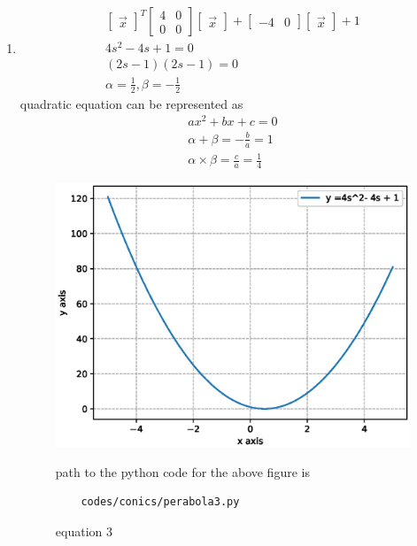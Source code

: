 \begin{enumerate}[label=\arabic*.,ref=\thesubsection.\theenumi]
\item
\begin{align}
\begin{bmatrix}\vec x\end{bmatrix}^T\begin{bmatrix}4 & 0\\0 & 0\end{bmatrix}\begin{bmatrix}\vec x\end{bmatrix} + \begin{bmatrix}-4 & 0\end{bmatrix}\begin{bmatrix}\vec x\end{bmatrix} +1
\\
4s^2-4s+1 = 0
\\
\left(2s-1\right)\left(2s - 1\right) = 0
\\
\alpha = \frac{1}{2} ,\beta =-\frac{1}{2} 
\end{align}
quadratic equation can be represented as 
\begin{align}
ax^2+bx +c = 0
\\
\alpha +\beta = -\frac{b}{a} = 1
\\
\alpha \times \beta = \frac{c}{a} = \frac{1}{4}
\end{align}
\begin{figure}[!ht]
	\centering
	\includegraphics[width=\columnwidth]{./figures/conics/perabola3.eps}
	\caption{equation 3 }
	\label{fig:perabola3}
	path to the python code for the above figure is
	\begin{lstlisting}
	codes/conics/perabola3.py
	\end{lstlisting} 
\end{figure}



\end{enumerate}
